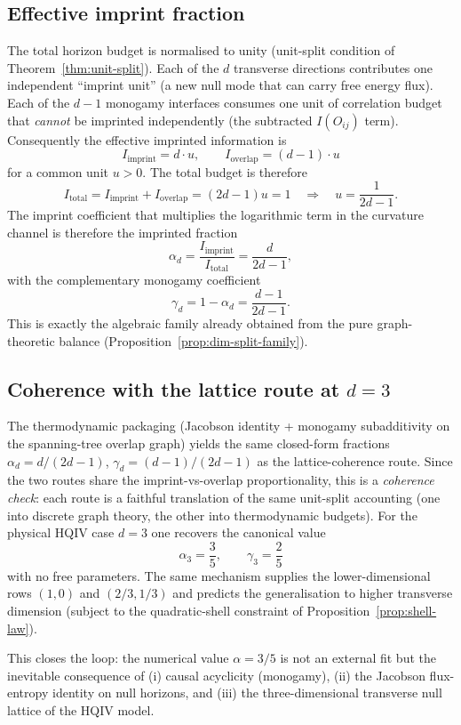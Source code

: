 \documentclass[11pt]{amsart}
\begin{document}
\subsection{Effective imprint fraction}

The total horizon budget is normalised to unity (unit-split condition of Theorem~\ref{thm:unit-split}). Each of the \(d\) transverse directions contributes one independent ``imprint unit'' (a new null mode that can carry free energy flux). Each of the \(d-1\) monogamy interfaces consumes one unit of correlation budget that \emph{cannot} be imprinted independently (the subtracted \(I(O_{ij})\) term). Consequently the effective imprinted information is
\[
I_{\mathrm{imprint}}=d\cdot u,\qquad I_{\mathrm{overlap}}=(d-1)\cdot u
\]
for a common unit \(u>0\). The total budget is therefore
\[
I_{\mathrm{total}}=I_{\mathrm{imprint}}+I_{\mathrm{overlap}}=(2d-1)u=1\quad\Rightarrow\quad u=\frac{1}{2d-1}.
\]
The imprint coefficient that multiplies the logarithmic term in the curvature channel is therefore the imprinted fraction
\[
\alpha_d=\frac{I_{\mathrm{imprint}}}{I_{\mathrm{total}}}=\frac{d}{2d-1},
\]
with the complementary monogamy coefficient
\[
\gamma_d=1-\alpha_d=\frac{d-1}{2d-1}.
\]
This is exactly the algebraic family already obtained from the pure graph-theoretic balance (Proposition~\ref{prop:dim-split-family}).

\subsection{Coherence with the lattice route at \texorpdfstring{\(d=3\)}{d=3}}

The thermodynamic packaging (Jacobson identity + monogamy subadditivity on the spanning-tree overlap graph) yields the same closed-form fractions \(\alpha_d=d/(2d-1)\), \(\gamma_d=(d-1)/(2d-1)\) as the lattice-coherence route. Since the two routes share the imprint-vs-overlap proportionality, this is a \emph{coherence check}: each route is a faithful translation of the same unit-split accounting (one into discrete graph theory, the other into thermodynamic budgets). For the physical HQIV case \(d=3\) one recovers the canonical value
\[
\alpha_3=\frac{3}{5},\qquad\gamma_3=\frac{2}{5}
\]
with no free parameters. The same mechanism supplies the lower-dimensional rows \((1,0)\) and \((2/3,1/3)\) and predicts the generalisation to higher transverse dimension (subject to the quadratic-shell constraint of Proposition~\ref{prop:shell-law}).

This closes the loop: the numerical value \(\alpha=3/5\) is not an external fit but the inevitable consequence of (i) causal acyclicity (monogamy), (ii) the Jacobson flux-entropy identity on null horizons, and (iii) the three-dimensional transverse null lattice of the HQIV model.
\end{document}
